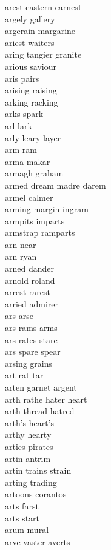 arest eastern earnest  \\
argely gallery \\
argerain margarine \\
ariest waiters \\
aring tangier granite  \\
arious saviour \\
aris pairs \\
arising raising\\
arking racking \\
arks spark \\
arl lark \\
arly leary layer \\
arm ram\\
arma makar \\
armagh graham\\
armed dream madre darem\\
armel calmer \\
arming margin ingram\\
armpits imparts\\
armstrap ramparts\\
arn near \\
arn ryan \\
arned dander \\
arnold roland\\
arrest rarest\\
arried admirer \\
ars arse \\
ars rams arms \\
ars rates stare  \\
ars spare spear  \\
arsing grains\\
art rat tar\\
arten garnet argent \\
arth rathe hater heart \\
arth thread hatred  \\
arth's heart's \\
arthy hearty \\
arties pirates \\
artin antrim \\
artin trains strain \\
arting trading \\
artoons corantos \\
arts farst \\
arts start \\
arum mural \\
arve vaster averts  \\
